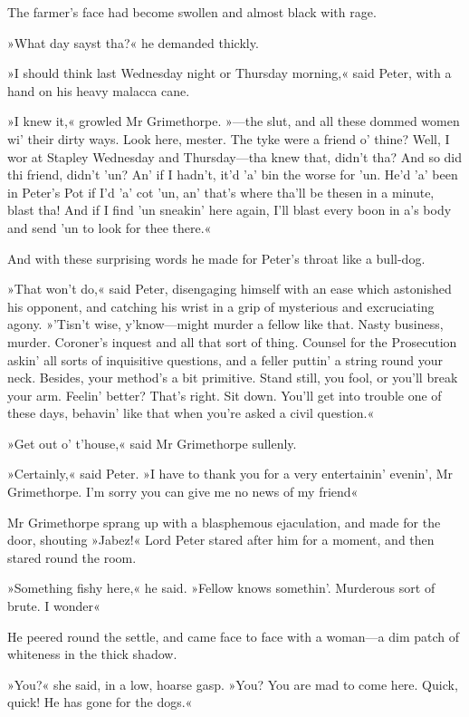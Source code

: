 The farmer's face had become swollen and almost black with rage.

»What day sayst tha?« he demanded thickly.

»I should think last Wednesday night or Thursday morning,« said Peter, with a hand on his heavy malacca cane.

»I knew it,« growled Mr Grimethorpe. »—the slut, and all these dommed women wi' their dirty ways. Look here, mester. The tyke were a friend o' thine? Well, I wor at Stapley Wednesday and Thursday—tha knew that, didn't tha? And so did thi friend, didn't 'un? An' if I hadn't, it'd 'a' bin the worse for 'un. He'd 'a' been in Peter's Pot if I'd 'a' cot 'un, an' that's where tha'll be thesen in a minute, blast tha! And if I find 'un sneakin' here again, I'll blast every boon in a's body and send 'un to look for thee there.«

And with these surprising words he made for Peter's throat like a bull-dog.

»That won't do,« said Peter, disengaging himself with an ease which astonished his opponent, and catching his wrist in a grip of mysterious and excruciating agony. »'Tisn't wise, y'know—might murder a fellow like that. Nasty business, murder. Coroner's inquest and all that sort of thing. Counsel for the Prosecution askin' all sorts of inquisitive questions, and a feller puttin' a string round your neck. Besides, your method's a bit primitive. Stand still, you fool, or you'll break your arm. Feelin' better? That's right. Sit down. You'll get into trouble one of these days, behavin' like that when you're asked a civil question.«

»Get out o' t'house,« said Mr Grimethorpe sullenly.

»Certainly,« said Peter. »I have to thank you for a very entertainin' evenin', Mr Grimethorpe. I'm sorry you can give me no news of my friend\longdash«

Mr Grimethorpe sprang up with a blasphemous ejaculation, and made for the door, shouting »Jabez!« Lord Peter stared after him for a moment, and then stared round the room.

»Something fishy here,« he said. »Fellow knows somethin'. Murderous sort of brute. I wonder\longdash«

He peered round the settle, and came face to face with a woman—a dim patch of whiteness in the thick shadow.

»You?« she said, in a low, hoarse gasp. »You? You are mad to come here.  Quick, quick! He has gone for the dogs.«

